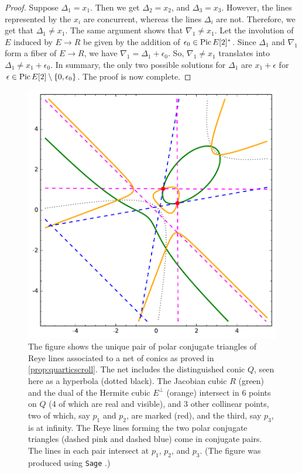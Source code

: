 \documentclass[11pt,reqno]{amsart}
\theoremstyle{plain}
\theoremstyle{definition}
\theoremstyle{remark}
\numberwithin{equation}{section}
\renewcommand{\to}{{\longrightarrow}}
\numberwithin{equation}{section}
\begin{document}
\begin{proof}
  Suppose $\Delta_1 = x_1$.
  Then we get $\Delta_2 = x_2$, and $\Delta_3 = x_3$.
  However, the lines represented by the $x_i$ are concurrent, whereas the lines $\Delta_i$ are not.
  Therefore, we get that $\Delta_1 \neq x_1$.
  The same argument shows that $\nabla_1 \neq x_1$.
  Let the involution of $E$ induced by $E \to R$ be given by the addition of $\epsilon_0 \in \operatorname{Pic} E [2]^*$.
  Since $\Delta_1$ and $\nabla_1$ form a fiber of $E \to R$, we have $\nabla_1 = \Delta_1 + \epsilon_0$.
  So, $\nabla_1 \neq x_1$ translates into $\Delta_1 \neq x_1 + \epsilon_0$.
  In summary, the only two possible solutions for $\Delta_1$ are $x_1 + \epsilon$ for $\epsilon \in \operatorname{Pic} E [2] \setminus \{0, \epsilon_0\}$.
  The proof is now complete.  
\end{proof}
\vfill
\begin{figure}
  \centering
  \includegraphics{quartic_scroll}
  \caption{
    The figure shows the unique pair of polar conjugate triangles of Reye lines associated to a net of conics as proved in \autoref{prop:quarticscroll}.
    The net includes the distinguished conic $Q$, seen here as a hyperbola (dotted black).
    The Jacobian cubic $R$ (green) and the dual of the Hermite cubic $E^\perp$ (orange) intersect in 6 points on $Q$ (4 of which are real and visible), and 3 other collinear points, two of which, say $p_1$ and $p_2$, are marked (red), and the third, say $p_3$, is at infinity.
    The Reye lines forming the two polar conjugate triangles (dashed pink and dashed blue) come in conjugate pairs.
    The lines in each pair intersect at $p_1$, $p_2$, and $p_3$.
    (The figure was produced using \texttt{Sage} \cite{the:17}.)
  }
  \label{fig:quarticscroll}
\end{figure}

 
 
   
\end{document}
